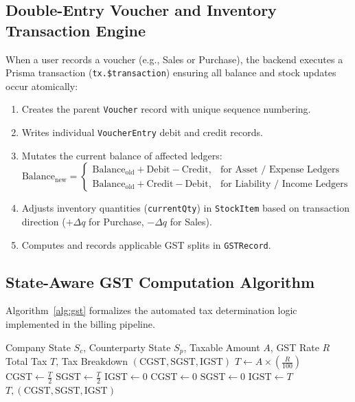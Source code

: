 \subsection{Double-Entry Voucher and Inventory Transaction Engine}
When a user records a voucher (e.g., Sales or Purchase), the backend executes a Prisma transaction (\texttt{tx.\$transaction}) ensuring all balance and stock updates occur atomically:
\begin{enumerate}
    \item Creates the parent \texttt{Voucher} record with unique sequence numbering.
    \item Writes individual \texttt{VoucherEntry} debit and credit records.
    \item Mutates the current balance of affected ledgers:
    \begin{equation}
      \text{Balance}_{\text{new}} = 
      \begin{cases}
        \text{Balance}_{\text{old}} + \text{Debit} - \text{Credit}, & \text{for Asset / Expense Ledgers} \\
        \text{Balance}_{\text{old}} + \text{Credit} - \text{Debit}, & \text{for Liability / Income Ledgers}
      \end{cases}
    \end{equation}
    \item Adjusts inventory quantities (\texttt{currentQty}) in \texttt{StockItem} based on transaction direction ($+\Delta q$ for Purchase, $-\Delta q$ for Sales).
    \item Computes and records applicable GST splits in \texttt{GSTRecord}.
\end{enumerate}

\subsection{State-Aware GST Computation Algorithm}
Algorithm~\ref{alg:gst} formalizes the automated tax determination logic implemented in the billing pipeline.

\begin{algorithm}[htbp]
\caption{State-Aware GST Tax Allocation Engine}
\label{alg:gst}
\begin{algorithmic}[1]
\Require Company State $S_c$, Counterparty State $S_p$, Taxable Amount $A$, GST Rate $R$
\Ensure Total Tax $T$, Tax Breakdown $(\text{CGST}, \text{SGST}, \text{IGST})$
\State $T \gets A \times \left(\frac{R}{100}\right)$
 
    \State $\text{CGST} \gets \frac{T}{2}$
    \State $\text{SGST} \gets \frac{T}{2}$
    \State $\text{IGST} \gets 0$
\Else {}
    \State $\text{CGST} \gets 0$
    \State $\text{SGST} \gets 0$
    \State $\text{IGST} \gets T$
\EndIf
\State \Return $T, (\text{CGST}, \text{SGST}, \text{IGST})$
\end{algorithmic}
\end{algorithm}

